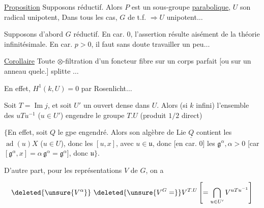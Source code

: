
\uline{Proposition} Supposons   réductif. Alors $P$ est un sous-groupe \uline{parabolique},  $U$ son radical unipotent,  Dans tous les cas, $G$  de t.f. $\Longrightarrow U$ unipotent$\ldots$


Supposons d'abord $G$ réductif. En car. $0$, l'assertion résulte aisément de la théorie infinitésimale. En car. $p>0$,  il faut sans doute travailler un peu$\ldots$

\uline{Corollaire} Toute $\otimes$-filtration d'un foncteur fibre sur un corps parfait [ou sur un anneau quelc.] splitte $\ldots$


En effet, $H^1(k,U)=0$ par Rosenlicht$\ldots$

 Soit $T=\operatorname{Im} j$, et soit $U'$ un ouvert dense dans $U$. Alors (si $k$  infini) l'ensemble des $uTu^{-1}$ ($u\in U'$) engendre  le groupe  $T.U$ (produit $1/2$ direct)

$\{$En effet, soit $Q$ le gpe engendré. Alors son algèbre de Lie $\underline Q$ contient les $\operatorname{ad}(u)X$ ($u\in U$), donc les  $[u,x]$, avec $u\in\mathfrak u$, donc [en car. $0$] les $\mathfrak g^\alpha,\alpha>0$ [car $[\mathfrak g^\alpha,x]=\alpha\,\mathfrak g^\alpha=\mathfrak g^\alpha$], donc $\mathfrak u\}$.


D'autre part, pour les représentations $V$ de $G$,  on a

\[
\deleted{\unsure{V^\alpha}}\ \deleted{\unsure{V^G=}} V^{T.U}\left[=\bigcap_{u\in U'} V^{uTu^{-1}}\right]
\]



